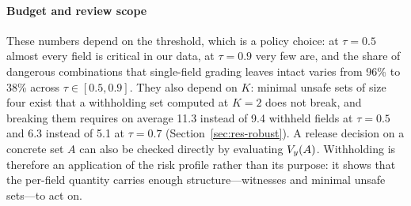 \paragraph{Budget and review scope}
These numbers depend on the threshold, which is a policy choice: at $\tau=0.5$ almost every field is
critical in our data, at $\tau=0.9$ very few are, and the share of dangerous combinations that
single-field grading leaves intact varies from 96\% to 38\% across $\tau\in[0.5,0.9]$. They also depend
on $K$: minimal unsafe sets of size four exist that a withholding set computed at $K=2$ does not break,
and breaking them requires on average 11.3 instead of 9.4 withheld fields at $\tau=0.5$ and 6.3 instead
of 5.1 at $\tau=0.7$ (Section~\ref{sec:res-robust}). A release decision on a concrete set $A$ can also be checked directly by
evaluating $V_y(A)$. Withholding is therefore an application of the risk profile rather than its purpose: it shows that
the per-field quantity carries enough structure---witnesses and minimal unsafe sets---to act on.


